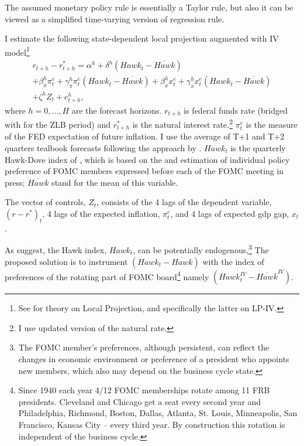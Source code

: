 \documentclass[11pt]{article}
\begin{document}
The assumed monetary policy rule is essentially a Taylor rule, but also it can be viewed as a simplified time-varying version of \citet{RomerRomer2004} regression rule.

I estimate the following state-dependent local projection augmented with IV model\footnote{See \citet{Jorda2005,PlagborgMollerWolf2021,Jorda2023} for theory on Local Projection, and specifically the latter on LP-IV.}
\begin{multline}
    r_{t+h}-r^*_{t+h}=\alpha^h+\delta^h\left(\mathit{Hawk}_{t}-\overline{\mathit{Hawk}}\right)\\ +\beta_\pi^h \pi_{t}^e+\gamma_\pi^h \pi_{t}^e\left(\mathit{Hawk}_{t}-\overline{\mathit{Hawk}}\right)+\beta_x^h x_{t}^e+\gamma_x^h x_{t}^e\left(\mathit{Hawk}_{t}-\overline{\mathit{Hawk}}\right)\\+\zeta^hZ_t+e_{t+h}^h,\label{eq:LP1}
\end{multline}
where $h=0,\dots, H$ are the forecast horizons. $r_{t+h}$ is federal funds rate (bridged with \citet{WuXia2016} for the ZLB period) and $r^*_{t+h}$ is the \citet{LW2003} natural interest rate.\footnote{I use \citet{HLW2023} updated version of the \citet{LW2003} natural rate.}
$\pi_t^e$ is the measure of the FED expectation of future inflation. 
I use the average of T+1 and T+2 quarters tealbook forecasts following the approach by \citet{CoibionGorodnichenko2011}. 
$\mathit{Hawk}_t$ is the quarterly Hawk-Dove index of \citet{HIM2023}, which is based on the \citet{Istrefi2019} and \citet{BordoIstrefi2023} estimation of individual policy preference of FOMC members expressed before each of the FOMC meeting in press; $\overline{\mathit{Hawk}}$ stand for the mean of this variable. 

The vector of controls, $Z_t$, consists of the 4 lags of the dependent variable, $\left(r-r^*\right)_t$, 4 lags of the expected inflation, $\pi_t^e$, and 4 lags of expected gdp gap, $x_t$.

As \citet{HIM2023} suggest, the Hawk index, $\mathit{Hawk}_t$, can be potentially endogenous,\footnote{The FOMC member's preferences, although persistent, can reflect the changes in economic environment or preference of a president who appoints new members, which also may depend on the business cycle state.}
The proposed solution is to instrument $\left(\mathit{Hawk}_{t}-\overline{\mathit{Hawk}}\right)$ with the index of preferences of the rotating part of FOMC board\footnote{Since 1940 each year 4/12 FOMC memberships rotate among 11 FRB presidents. Cleveland and Chicago get a seat every second year and Philadelphia, Richmond, Boston, Dallas, Atlanta, St. Louis, Minneapolis, San Francisco, Kansas City -- every third year. By construction this rotation is independent of the business cycle.} namely $\left(\mathit{Hawk}_{t}^\mathit{IV}-\overline{\mathit{Hawk}}^\mathit{IV}\right)$.
\end{document}
